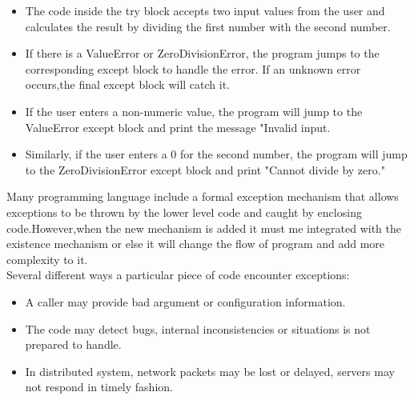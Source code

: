 {
	\begin{itemize} 
		\item The code inside the try block accepts two input values from the user and calculates the result by dividing the first number with the second number.
		\item If there is a ValueError or ZeroDivisionError, the program jumps to the corresponding except block to handle the error. If an unknown error occurs,the final except block will catch it.
		\item If the user enters a non-numeric value, the program will jump to the ValueError except block and print the message "Invalid input.
		\item Similarly, if the user enters a 0 for the second number, the program will jump to the ZeroDivisionError except block and print "Cannot divide by zero."
	\end{itemize}
}


\STANDARD{}
{ 
	
	
	
	Many programming language include a formal exception mechanism that allows exceptions to be thrown by the lower level code and caught by enclosing code.However,when the new mechanism is added it must me integrated with the existence mechanism or else it will change the flow of program and add more complexity to it.\\ \bigskip
	Several different ways a particular piece of code encounter exceptions:
	\begin{itemize}
		\item A caller may provide bad argument or configuration information.
		\item The code may detect bugs, internal inconsistencies or situations is not prepared to handle.
		\item In distributed system, network packets may be lost or delayed, servers may not respond in timely fashion.
	\end{itemize}
	
	
}


